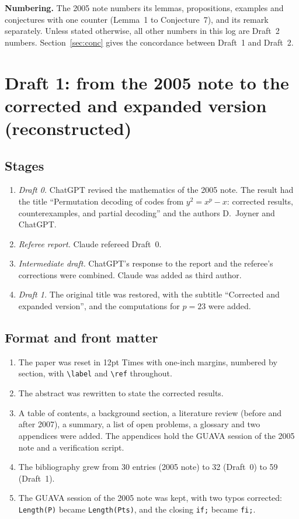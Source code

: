 \documentclass[12pt,letterpaper]{article}
\begin{document}
\medskip
\noindent\textbf{Numbering.} The 2005 note numbers its lemmas, propositions,
examples and conjectures with one counter (Lemma~1 to Conjecture~7), and its remark
separately. Unless stated otherwise, all other numbers in this log are Draft~2
numbers. Section~\ref{sec:conc} gives the concordance between Draft~1 and Draft~2.

\section{Draft 1: from the 2005 note to the corrected and expanded version
(reconstructed)}\label{sec:draft1}

\subsection{Stages}
\begin{enumerate}
\item \emph{Draft 0.} ChatGPT revised the mathematics of the 2005 note. The result
had the title ``Permutation decoding of codes from $y^2=x^p-x$: corrected results,
counterexamples, and partial decoding'' and the authors D.~Joyner and ChatGPT.
\item \emph{Referee report.} Claude refereed Draft~0.
\item \emph{Intermediate draft.} ChatGPT's response to the report and the
referee's corrections were combined. Claude was added as third author.
\item \emph{Draft 1.} The original title was restored, with the subtitle
``Corrected and expanded version'', and the computations for $p=23$ were added.
\end{enumerate}

\subsection{Format and front matter}
\begin{enumerate}
\item The paper was reset in 12pt Times with one-inch margins, numbered by
section, with \verb|\label| and \verb|\ref| throughout.
\item The abstract was rewritten to state the corrected results.
\item A table of contents, a background section, a literature review (before and
after 2007), a summary, a list of open problems, a glossary and two appendices
were added. The appendices hold the GUAVA session of the 2005 note and a
verification script.
\item The bibliography grew from 30 entries (2005 note) to 32 (Draft~0) to 59
(Draft~1).
\item The GUAVA session of the 2005 note was kept, with two typos corrected:
\texttt{Length(P)} became \texttt{Length(Pts)}, and the closing \texttt{if;} became
\texttt{fi;}.
\end{enumerate}
\end{document}
